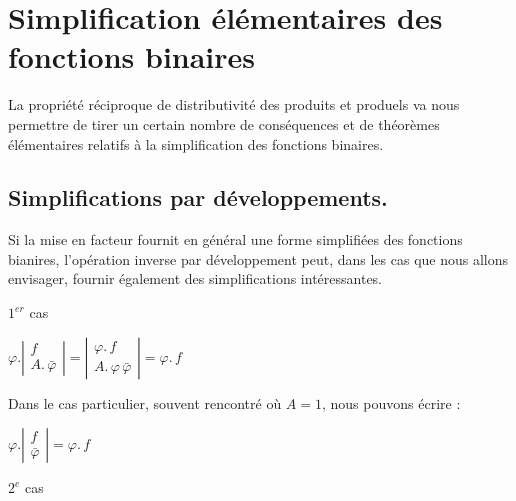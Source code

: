 \section{Simplification élémentaires des fonctions binaires}

La propriété réciproque de distributivité des produits et produels
va nous permettre de tirer un certain nombre de conséquences et de
théorèmes élémentaires relatifs à la simplification des fonctions
binaires.

\subsection{Simplifications par développements. }

Si la mise en facteur fournit en général une forme simplifiées des
fonctions bianires, l'opération inverse par développement peut, dans
les cas que nous allons envisager, fournir également des simplifications
intéressantes. 

$1^{er}$ cas

\begin{center}
$\varphi.\left|\begin{array}{c}
f\\
A.\,\bar{\varphi}
\end{array}\right|=\left|\begin{array}{c}
\varphi.\,f\\
A.\,\varphi\,\bar{\varphi}
\end{array}\right|=\varphi.\,f$
\end{center}

Dans le cas particulier, souvent rencontré où $A=1$, nous pouvons
écrire : 

\begin{center}
$\varphi.\left|\begin{array}{c}
f\\
\bar{\varphi}
\end{array}\right|=\varphi.\,f$
\end{center}

$2^{e}$ cas

